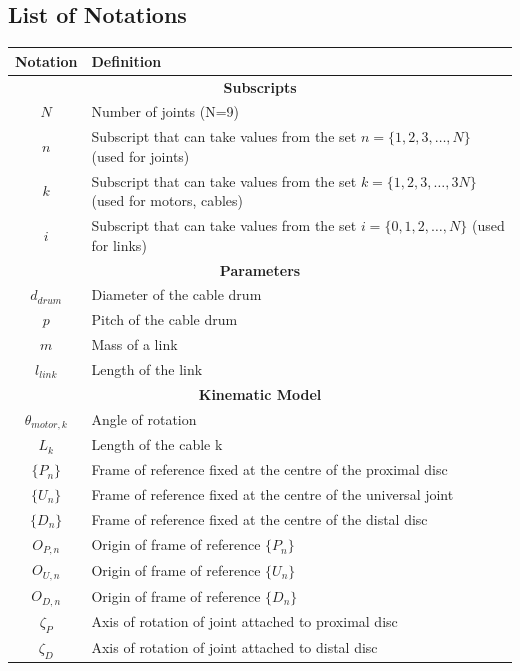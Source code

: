 \documentclass[a4paper,12pt]{report}
\begin{document}
\begin{appendices}
	\chapter{List of Notations}
	\label{appendix:notations}
	\begin{center}
		\begingroup
		\renewcommand{\arraystretch}{1.5}
		\begin{longtable}{|c|p{12cm}|}
			\hline
			\textbf{Notation} & \textbf{Definition}  \\ 
			\hline
			\multicolumn{2}{|c|}{\textbf{Subscripts}} \\
			\hline
			$N$ & Number of joints (N=9) \\
			$n$ & \makecell[l]{Subscript that can take values from the set \\ $n=\{1,2,3,\ldots,N\}$ (used for joints)} \\
			$k$ & \makecell[l]{Subscript that can take values from the set \\ $k=\{1,2,3,\ldots,3N\}$ (used for motors, cables)} \\
			$i$ & \makecell[l]{Subscript that can take values from the set \\ $i=\{0,1,2,\ldots,N\}$ (used for links)} \\
			\hline
			\multicolumn{2}{|c|}{\textbf{Parameters}} \\
			\hline
			$d_{drum}$ & Diameter of the cable drum \\
			$p$ & Pitch of the cable drum \\
			$m$ & Mass of a link\\
			$l_{link}$ & Length of the link\\
			\hline
			\multicolumn{2}{|c|}{\textbf{Kinematic Model}} \\
			\hline
			$\theta_{motor,k}$ & Angle of rotation\\
			$L_{k}$ & Length of the cable k \\
			$\{P_n\}$ & Frame of reference fixed at the centre of the proximal disc\\
			$\{U_n\}$ & Frame of reference fixed at the centre of the universal joint\\
			$\{D_n\}$ & Frame of reference fixed at the centre of the distal disc\\
			$O_{P,n}$ & Origin of frame of reference $\{P_n\}$\\
			$O_{U,n}$ & Origin of frame of reference $\{U_n\}$\\
			$O_{D,n}$ & Origin of frame of reference $\{D_n\}$\\
			$\zeta_{P}$ & Axis of rotation of joint attached to proximal disc  \\ 
			$\zeta_{D}$ & Axis of rotation of joint attached to distal disc  \\
			

\end{longtable}
\end{center}
\end{appendices}
\end{document}
